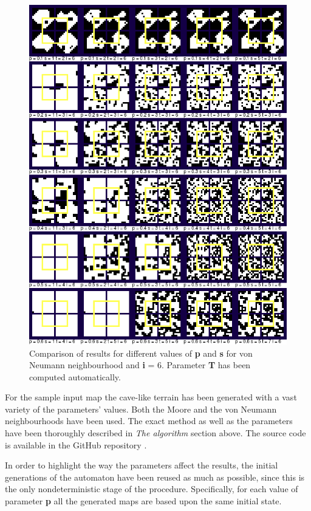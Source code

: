 \documentclass[a4paper, 11pt]{article} %
\begin{document}
\begin{figure}[ht]
        \centering
        \includegraphics[width=1.\textwidth]{neumann_sp}
	\caption{Comparison of results for different values of \textbf{p} and \textbf{s} for von Neumann neighbourhood and \textbf{i} = 6. Parameter \textbf{T} has been computed automatically.}
	\label{fig:results4}
\end{figure}

For the sample input map the cave-like terrain has been generated with a vast variety of the parameters' values. Both the Moore and the von Neumann neighbourhoods have been used. The exact method as well as the parameters have been thoroughly described in \emph{The algorithm} section above. The source code is available in the GitHub repository \cite{repo}.

In order to highlight the way the parameters affect the results, the initial generations of the automaton have been reused as much as possible, since this is the only nondeterministic stage of the procedure. Specifically, for each value of parameter \textbf{p} all the generated maps are based upon the same initial state.
\end{document}
